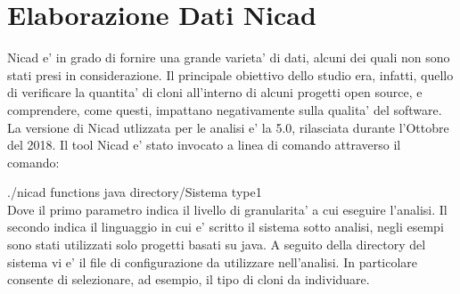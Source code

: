 \section{Elaborazione Dati Nicad}
Nicad e' in grado di fornire una grande varieta' di dati, alcuni dei quali non sono stati presi in considerazione. Il principale obiettivo dello studio era, infatti, quello di verificare la quantita' di cloni all'interno di alcuni progetti open source, e comprendere, come questi, impattano negativamente sulla qualita' del software.
La versione di Nicad utlizzata per le analisi e' la 5.0, rilasciata durante l'Ottobre del 2018. 
Il tool Nicad e' stato invocato a linea di comando attraverso il comando:

./nicad functions java directory/Sistema type1
\\

Dove il primo parametro indica il livello di granularita' a cui eseguire l'analisi. Il secondo indica il linguaggio in cui e' scritto il sistema sotto analisi, negli esempi sono stati utilizzati solo progetti basati su java. A seguito della directory del sistema vi e' il file di configurazione da utilizzare nell'analisi. In particolare consente di selezionare, ad esempio, il tipo di cloni da individuare.

